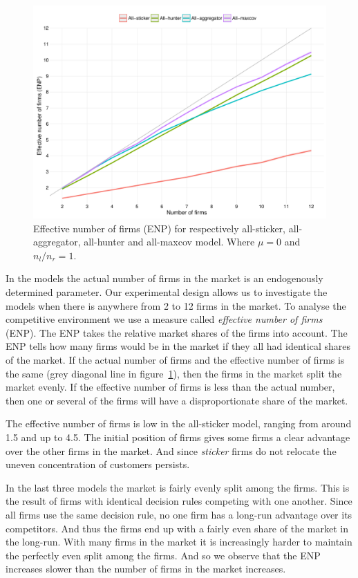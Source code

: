 \documentclass[preprint, 12pt]{elsarticle}
\newcommand*{\TODO}{\textbf{\fbox{??}}}%
\begin{document}
\begin{figure}[ht!]
	\centering
	\includegraphics[width=\textwidth]{Graphics/fig22a.pdf}
	\caption{Effective number of firms (ENP) for respectively all-sticker, all-aggregator, all-hunter and all-maxcov model. Where $\mu=0$ and $n_l/n_r=1$.}
	\label{fig:enp}
\end{figure}

In the models the actual number of firms in the market is an endogenously determined parameter. Our experimental design allows us to investigate the models when there is anywhere from 2 to 12 firms in the market. To analyse the competitive environment we use a measure called \emph{effective number of firms} (ENP). The ENP takes the relative market shares of the firms into account. The ENP tells how many firms would be in the market if they all had identical shares of the market. If the actual number of firms and the effective number of firms is the same (grey diagonal line in figure~\ref{fig:enp}), then the firms in the market split the market evenly. If the effective number of firms is less than the actual number, then one or several of the firms will have a disproportionate share of the market.

The effective number of firms is low in the all-sticker model, ranging from around 1.5 and up to 4.5. The initial position of firms gives some firms a clear advantage over the other firms in the market. And since \emph{sticker} firms do not relocate the uneven concentration of customers persists.

In the last three models the market is fairly evenly split among the firms. \TODO{This is the result of firms with identical decision rules competing with one another. Since all firms use the same decision rule, no one firm has a long-run advantage over its competitors. And thus the firms end up with a fairly even share of the market in the long-run.} With many firms in the market it is increasingly harder to maintain the perfectly even split among the firms. And so we observe that the ENP increases slower than the number of firms in the market increases.
\end{document}
